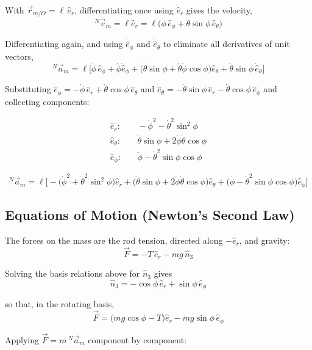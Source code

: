 \documentclass[11pt]{article}
\begin{document}
With $\vec r_{m/O} = \ell\,\hat e_r$, differentiating once using $\dot{\hat e}_r$ gives the velocity,
\[
    {}^{N}\vec v_m = \ell\dot{\hat e}_r = \ell\big(\dot\phi\,\hat e_\phi + \dot\theta\sin\phi\,\hat e_\theta\big)
\]

Differentiating again, and using $\dot{\hat e}_\phi$ and $\dot{\hat e}_\theta$ to eliminate all derivatives of unit vectors,
\[
    {}^{N}\vec a_m = \ell\Big[
        \ddot\phi\,\hat e_\phi + \dot\phi\dot{\hat e}_\phi
        + \big(\ddot\theta\sin\phi + \dot\theta\dot\phi\cos\phi\big)\hat e_\theta
        + \dot\theta\sin\phi\,\dot{\hat e}_\theta
    \Big]
\]

Substituting $\dot{\hat e}_\phi = -\dot\phi\,\hat e_r + \dot\theta\cos\phi\,\hat e_\theta$ and $\dot{\hat e}_\theta = -\dot\theta\sin\phi\,\hat e_r - \dot\theta\cos\phi\,\hat e_\phi$ and collecting components:

\begin{align*}
    \hat e_r: &\quad -\dot\phi^{2} - \dot\theta^{2}\sin^{2}\phi \\
    \hat e_\theta: &\quad \ddot\theta\sin\phi + 2\dot\phi\dot\theta\cos\phi \\
    \hat e_\phi: &\quad \ddot\phi - \dot\theta^{2}\sin\phi\cos\phi
\end{align*}

\begin{result}
\[
    {}^{N}\vec a_m = \ell\Big[
        -\big(\dot\phi^{2}+\dot\theta^{2}\sin^{2}\phi\big)\hat e_r
        + \big(\ddot\theta\sin\phi + 2\dot\phi\dot\theta\cos\phi\big)\hat e_\theta
        + \big(\ddot\phi - \dot\theta^{2}\sin\phi\cos\phi\big)\hat e_\phi
    \Big]
\]
\end{result}

\subsection*{Equations of Motion (Newton's Second Law)}

The forces on the mass are the rod tension, directed along $-\hat e_r$, and gravity:
\[
    \vec F = -T\,\hat e_r - mg\,\hat n_3
\]

Solving the basis relations above for $\hat n_3$ gives
\[
    \hat n_3 = -\cos\phi\,\hat e_r + \sin\phi\,\hat e_\phi
\]

so that, in the rotating basis,
\[
    \vec F = \big(mg\cos\phi - T\big)\hat e_r - mg\sin\phi\,\hat e_\phi
\]

Applying $\vec F = m\,{}^{N}\vec a_m$ component by component:
\end{document}
